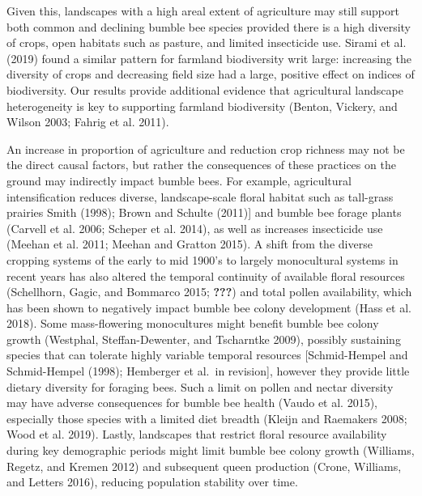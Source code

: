 \documentclass[11pt,]{article}
\begin{document}
Given this, landscapes with a high areal extent of agriculture may still
support both common and declining bumble bee species provided there is a
high diversity of crops, open habitats such as pasture, and limited
insecticide use. Sirami et al. (2019) found a similar pattern for
farmland biodiversity writ large: increasing the diversity of crops and
decreasing field size had a large, positive effect on indices of
biodiversity. Our results provide additional evidence that agricultural
landscape heterogeneity is key to supporting farmland biodiversity
(Benton, Vickery, and Wilson 2003; Fahrig et al. 2011).

An increase in proportion of agriculture and reduction crop richness may
not be the direct causal factors, but rather the consequences of these
practices on the ground may indirectly impact bumble bees. For example,
agricultural intensification reduces diverse, landscape-scale floral
habitat such as tall-grass prairies Smith (1998); Brown and Schulte
(2011){]} and bumble bee forage plants (Carvell et al. 2006; Scheper et
al. 2014), as well as increases insecticide use (Meehan et al. 2011;
Meehan and Gratton 2015). A shift from the diverse cropping systems of
the early to mid 1900's to largely monocultural systems in recent years
has also altered the temporal continuity of available floral resources
(Schellhorn, Gagic, and Bommarco 2015; {\textbf{???}}) and total pollen
availability, which has been shown to negatively impact bumble bee
colony development (Hass et al. 2018). Some mass-flowering monocultures
might benefit bumble bee colony growth (Westphal, Steffan-Dewenter, and
Tscharntke 2009), possibly sustaining species that can tolerate highly
variable temporal resources {[}Schmid-Hempel and Schmid-Hempel (1998);
Hemberger et al.~in revision{]}, however they provide little dietary
diversity for foraging bees. Such a limit on pollen and nectar diversity
may have adverse consequences for bumble bee health (Vaudo et al. 2015),
especially those species with a limited diet breadth (Kleijn and
Raemakers 2008; Wood et al. 2019). Lastly, landscapes that restrict
floral resource availability during key demographic periods might limit
bumble bee colony growth (Williams, Regetz, and Kremen 2012) and
subsequent queen production (Crone, Williams, and Letters 2016),
reducing population stability over time.
\end{document}
